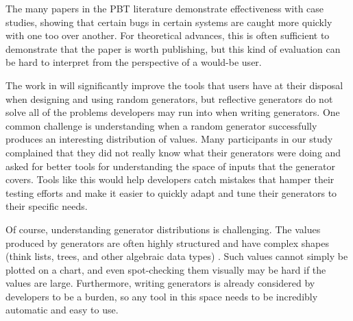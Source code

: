 The many papers in the PBT literature demonstrate effectiveness with case
studies, showing that certain bugs in certain systems are caught more quickly
with one too over another. For theoretical advances, this is often sufficient
to demonstrate that the paper is worth publishing, but this kind of evaluation
can be hard to interpret from the perspective of a would-be user. 


\newcommand{\genvis}{GenVis}

The work in  will significantly improve the tools that
users have at their disposal when designing and using random generators, but
reflective generators do not solve all of the problems developers may run into
when writing generators. One common challenge is understanding when a random
generator successfully produces an interesting distribution of values. Many
participants in our study complained that they did not really know what their
generators were doing and asked for better tools for understanding the space of
inputs that the generator covers. Tools like this would help developers catch
mistakes that hamper their testing efforts and make it easier to quickly adapt
and tune their generators to their specific needs.

Of course, understanding generator distributions is challenging.  The values
produced by generators are often highly structured and have complex shapes
(think lists, trees, and other algebraic data types) .  Such values cannot simply
be plotted on a chart, and even spot-checking them visually may be hard if the
values are large.  Furthermore, writing generators is already considered by
developers to be a burden, so any tool in this space needs to be incredibly
automatic and easy to use.

